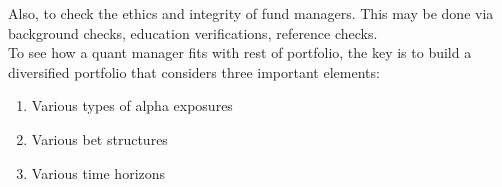 Also, to check the ethics and integrity of fund managers. This may be done via background checks, education verifications, reference checks.\\

To see how a quant manager fits with rest of portfolio, the key is to build a diversified portfolio that considers three important elements:
\begin{enumerate}[label=\roman*.]
\setlength{\itemsep}{0pt}
\item Various types of alpha exposures
\item Various bet structures
\item Various time horizons
\end{enumerate}






